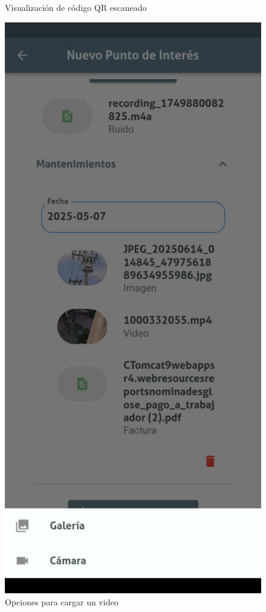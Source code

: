 \documentclass[12pt, a4paper]{book}
\begin{document}
\begin{figure}[H]
\begin{minipage}[b]{0.3\textwidth}
    \caption{Visualización de código QR escaneado}
    \label{fig:medias2}
  \end{minipage}
  \hspace{0.02\textwidth}
  \begin{minipage}[b]{0.3\textwidth}
    \centering
    \includegraphics[width=\textwidth]{images/functionality_test/medias_3.jpg}
    \caption{Opciones para cargar un video}
    \label{fig:medias3}
  \end{minipage}
\end{figure}
\end{document}
